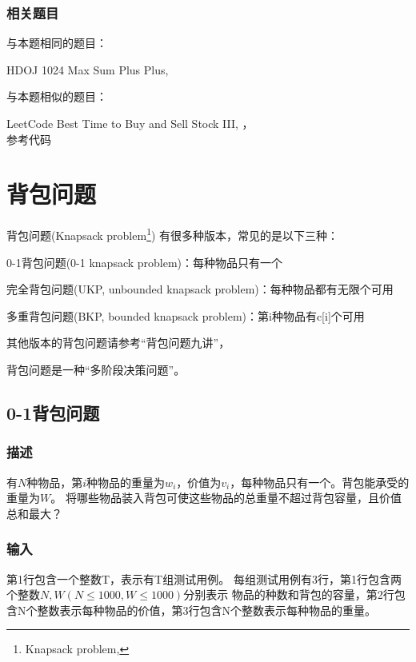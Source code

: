 \subsubsection{相关题目}
与本题相同的题目：
\begindot
\item HDOJ 1024 Max Sum Plus Plus, 
\myenddot

与本题相似的题目：
\begindot
\item LeetCode Best Time to Buy and Sell Stock III, ，\\
参考代码
\myenddot


\section{背包问题} %
背包问题(Knapsack problem\footnote{Knapsack problem, })
有很多种版本，常见的是以下三种：
\begindot
\item 0-1背包问题(0-1 knapsack problem)：每种物品只有一个
\item 完全背包问题(UKP, unbounded knapsack problem)：每种物品都有无限个可用
\item 多重背包问题(BKP, bounded knapsack problem)：第i种物品有c[i]个可用
\myenddot

其他版本的背包问题请参考“背包问题九讲”，

背包问题是一种“多阶段决策问题”。

\subsection{0-1背包问题}

\subsubsection{描述}
有$N$种物品，第$i$种物品的重量为$w_i$，价值为$v_i$，每种物品只有一个。背包能承受的重量为$W$。
将哪些物品装入背包可使这些物品的总重量不超过背包容量，且价值总和最大？

\subsubsection{输入}
第1行包含一个整数T，表示有T组测试用例。
每组测试用例有3行，第1行包含两个整数$N, W(N \leq 1000 , W \leq 1000)$分别表示
物品的种数和背包的容量，第2行包含N个整数表示每种物品的价值，第3行包含N个整数表示每种物品的重量。

